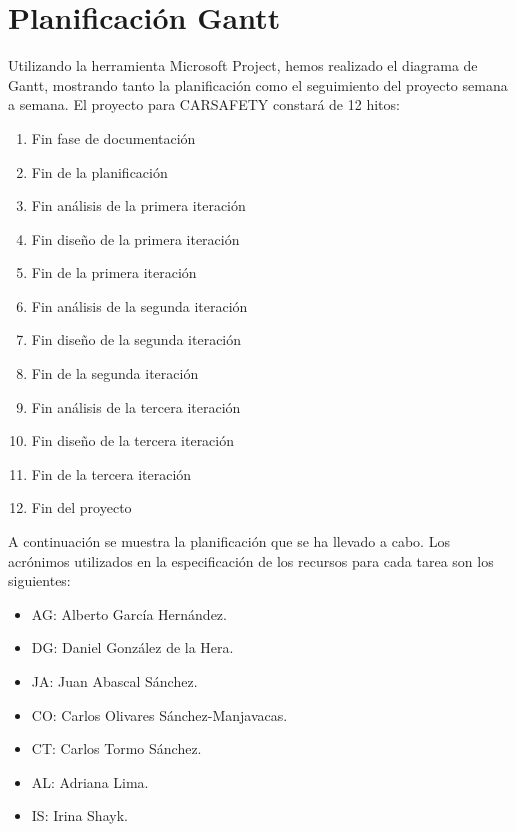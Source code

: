 \section{Planificación Gantt}

\par Utilizando la herramienta Microsoft Project, hemos realizado el diagrama de Gantt, mostrando tanto la planificación como el seguimiento del proyecto semana a semana. El proyecto para CARSAFETY constará de 12 hitos:

\begin{enumerate}
  \item Fin fase de documentación
  \item Fin de la planificación
  \item Fin análisis de la primera iteración
  \item Fin diseño de la primera iteración
  \item Fin de la primera iteración
  \item Fin análisis de la segunda iteración
  \item Fin diseño de la segunda iteración
  \item Fin de la segunda iteración
  \item Fin análisis de la tercera iteración
  \item Fin diseño de la tercera iteración
  \item Fin de la tercera iteración
  \item Fin del proyecto
\end{enumerate}
\clearpage

\par A continuación se muestra la planificación que se ha llevado a cabo. Los acrónimos utilizados en la especificación de los recursos para cada tarea son los siguientes:
\begin{itemize}
  \item AG: Alberto García Hernández.
  \item DG: Daniel González de la Hera.
  \item JA: Juan Abascal Sánchez.
  \item CO: Carlos Olivares Sánchez-Manjavacas.
  \item CT: Carlos Tormo Sánchez.
  \item AL: Adriana Lima.
  \item IS: Irina Shayk. 
\end{itemize}

